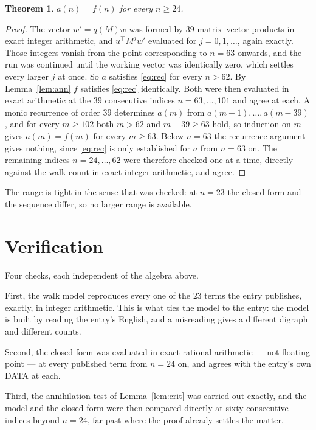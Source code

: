 \documentclass[11pt,a4paper]{article}
\theoremstyle{plain}
\newtheorem{theorem}{Theorem}
\theoremstyle{definition}
\begin{document}
\begin{theorem}
$a(n)=f(n)$ for every $n\ge24$.
\end{theorem}

\begin{proof}
The vector $w'=q(M)w$ was formed by $39$ matrix--vector products in exact integer
arithmetic, and $u^{\!\top}M^{j}w'$ evaluated for $j=0,1,\dots$, again exactly. Those integers
vanish from the point corresponding to $n=63$ onwards, and the run was continued until the
working vector was identically zero, which settles every larger $j$ at once. So $a$ satisfies
\eqref{eq:rec} for every $n>62$. By Lemma~\ref{lem:ann} $f$ satisfies \eqref{eq:rec}
identically. Both were then evaluated in exact arithmetic at the $39$ consecutive indices
$n=63,\dots,101$ and agree at each. A monic recurrence of order $39$
determines $a(m)$ from $a(m-1),\dots,a(m-39)$, and for every $m\ge102$ both
$m>62$ and $m-39\ge63$ hold, so induction on $m$ gives $a(m)=f(m)$ for every
$m\ge63$.
Below $n=63$ the recurrence argument gives nothing, since \eqref{eq:rec} is only
established for $a$ from $n=63$ on. The remaining indices $n=24,\dots,62$ were
therefore checked one at a time, directly against the walk count in exact integer arithmetic,
and agree.
\end{proof}

The range is tight in the sense that was checked: at $n=23$ the closed form and the sequence differ, so no larger range is available.

\section{Verification}

Four checks, each independent of the algebra above.

First, the walk model reproduces every one of the $23$ terms the entry publishes,
exactly, in integer arithmetic. This is what ties the model to the entry: the model is built
by reading the entry's English, and a misreading gives a different digraph and different
counts.

Second, the closed form was evaluated in exact rational arithmetic --- not floating point ---
at every published term from $n=24$ on, and agrees with the entry's own DATA at each.

Third, the annihilation test of Lemma~\ref{lem:crit} was carried out exactly, and the model
and the closed form were then compared directly at sixty consecutive indices beyond
$n=24$, far past where the proof already settles the matter.
\end{document}
